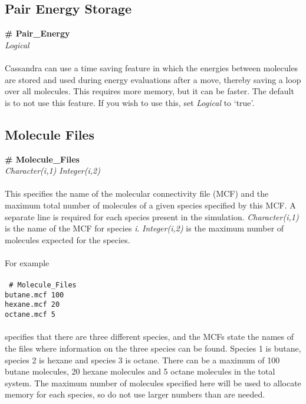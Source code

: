 \subsection{Pair Energy Storage}\label{sec:Pair_Energy}
{\bf \# Pair\_Energy} \\
{\it Logical} \\ \\
%
Cassandra can use a time saving feature in which the energies between
molecules are stored and used during energy evaluations after a move,
thereby saving a loop over all molecules.
This requires more memory, but it can be faster.
The default is to not use this feature.
If you wish to use this, set {\it Logical} to `true'.
%
%
%
%
\subsection{Molecule Files}\label{sec:Molecule_Files}
{\bf \# Molecule\_Files} \\
{\it Character(i,1) Integer(i,2)}  \\ \\
%
This specifies the name of the molecular connectivity file (MCF) and
the maximum total number of molecules of a given species specified by this MCF.
A separate line is required for each species present in the simulation.
{\it Character(i,1)} is the name of the MCF for species {\it i}.
{\it Integer(i,2)} is the maximum number of molecules expected for the species.  \\ \\
For example \\ \\
\texttt{
\# Molecule\_Files \\
butane.mcf 100 \\
hexane.mcf 20\\
octane.mcf 5} \\ \\
specifies that there are three different species, and the MCFs
state the names of the files where information on the three species
can be found.
Species 1 is butane, species 2 is hexane and species 3 is octane.
There can be a maximum of 100 butane molecules, 20 hexane molecules
and 5 octane molecules in the total system.
The maximum
number of molecules specified here will be used to allocate memory for
each species, so do not use larger numbers than are needed.
%
%
